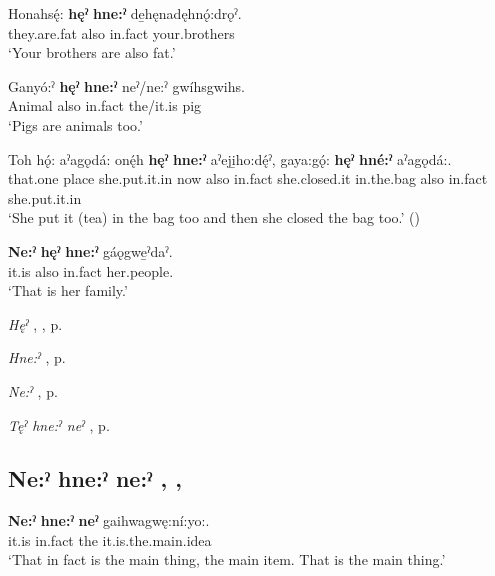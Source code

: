 \ea
\label{ex:npar75}
\gll Honahsę́: \textbf{hęˀ} \textbf{hne:ˀ} de̱hęnadęhnǫ́:drǫˀ.\\
they.are.fat also in.fact your.brothers\\
\glt ‘Your brothers are also fat.’
\z

\ea
\label{ex:npar76}
\gll Ganyó:ˀ \textbf{hęˀ} \textbf{hne:ˀ} neˀ/ne:ˀ gwíhsgwihs.\\
Animal also in.fact the/it.is pig\\
\glt ‘Pigs are animals too.’
\z

\ea
\label{ex:npar77}
\gll Toh hǫ́: aˀagǫdá: onę́h \textbf{hęˀ} \textbf{hne:ˀ} aˀeji̱ho:dę́ˀ, gaya:gǫ́: \textbf{hęˀ} \textbf{hné:ˀ} aˀagǫdá:.\\
that.one place she.put.it.in now also in.fact she.closed.it in.the.bag also in.fact she.put.it.in\\
\glt ‘She put it (tea) in the bag too and then she closed the bag too.’ (\cite{henry_de_2005})
\z

\ea
\label{ex:npar78}
\gll \textbf{Ne:ˀ} \textbf{hęˀ} \textbf{hne:ˀ} gáǫgwe̱ˀdaˀ.\\
it.is also in.fact her.people.\\
\glt ‘That is her family.’
\z

\begin{CayugaRelated}
\item \textit{Hęˀ} , , p. \pageref{p:[hęˀ]}\\
\item \textit{Hne:ˀ} , p. \pageref{p:[hne:ˀ] ‘in fact’}\\
\item \textit{Ne:ˀ} , p. \pageref{p:[ne:ˀ] `it is’}\\
\item \textit{Tęˀ hne:ˀ neˀ} , p. \pageref{p:[tęˀ hne:ˀ neˀ]}
\end{CayugaRelated}

\subsection*{\textbf{Ne:ˀ hne:ˀ ne:ˀ} , , } \label{p:[ne:ˀ hne:ˀ ne:ˀ]}

\ea
\label{ex:npar79}
\gll \textbf{Ne:ˀ} \textbf{hne:ˀ} \textbf{neˀ} gaihwagwę:ní:yo:.\\
it.is in.fact the it.is.the.main.idea\\
\glt ‘That in fact is the main thing, the main item. That is the main thing.’
\z

